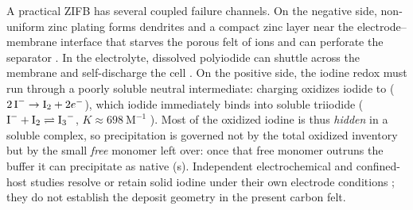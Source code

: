 \documentclass[11pt]{article}
\begin{document}
A practical ZIFB has several coupled failure channels. On the negative side, non-uniform zinc plating forms
dendrites and a compact zinc layer near the electrode--membrane interface that starves the porous
felt of ions and can perforate the separator \citep{Richtr2026,ZnBr_CurrentDist2024,Guo2025}. In the
electrolyte, dissolved polyiodide can shuttle across the membrane and self-discharge the cell
\citep{LiuMembrane2025,Wei2025,XuZnBr2024}. On the positive side, the iodine redox must run through a poorly
soluble neutral intermediate: charging oxidizes iodide to  ($2\,\ce{I^-}\rightarrow\ce{I2}+2e^-$),
which iodide immediately binds into soluble triiodide
($\ce{I^-}+\ce{I2}\rightleftharpoons\ce{I3^-}$, $K\approx698~\mathrm{M^{-1}}$ \citep{Palmer1984,Wen2025}).
Most of the oxidized iodine is thus \emph{hidden} in a soluble complex, so precipitation is governed not by the
total oxidized inventory but by the small \emph{free}  monomer left over: once that free monomer outruns
the buffer it can precipitate as native (s). Independent electrochemical and confined-host studies
resolve or retain solid iodine under their own electrode conditions \citep{Fitzek2023,SolidI2_NatCommun2020};
they do not establish the deposit geometry in the present carbon felt.
\end{document}
